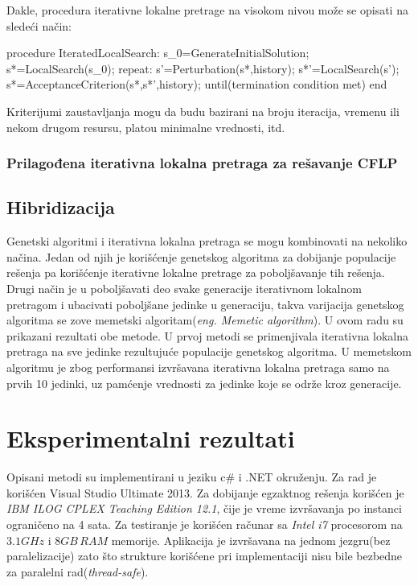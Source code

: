 \documentclass[a4paper]{article}
\begin{document}
Dakle, procedura iterativne lokalne pretrage na visokom nivou može se opisati na sledeći način:

\begin{algorithm}
procedure IteratedLocalSearch:
	s_0=GenerateInitialSolution;
	s*=LocalSearch(s_0);
	repeat:
		s'=Perturbation(s*,history);
		s*'=LocalSearch(s');
		s*=AcceptanceCriterion(s*,s*',history);
	until(termination condition met)
end
\end{algorithm}

Kriterijumi zaustavljanja mogu da budu bazirani na broju iteracija, vremenu ili nekom drugom resursu, platou minimalne vrednosti, itd.

\subsubsection{Prilagođena iterativna lokalna pretraga za rešavanje CFLP}
\subsection{Hibridizacija}

Genetski algoritmi i iterativna lokalna pretraga se mogu kombinovati na nekoliko načina. Jedan od njih je korišćenje genetskog algoritma za dobijanje populacije rešenja pa korišćenje iterativne lokalne pretrage za poboljšavanje tih rešenja. Drugi način je u poboljšavati deo svake generacije iterativnom lokalnom pretragom i ubacivati poboljšane jedinke u generaciju, takva varijacija genetskog algoritma se zove memetski algoritam(\emph{eng. Memetic algorithm})\cite{memetic}. U ovom radu su prikazani rezultati obe metode. U prvoj metodi se primenjivala iterativna lokalna pretraga na sve jedinke rezultujuće populacije genetskog algoritma. U memetskom algoritmu je zbog performansi izvršavana iterativna lokalna pretraga samo na prvih 10 jedinki, uz pamćenje vrednosti za jedinke koje se održe kroz generacije.
\section{Eksperimentalni rezultati}

Opisani metodi su implementirani u jeziku c\# i .NET okruženju. Za rad je korišćen Visual Studio Ultimate 2013. Za dobijanje egzaktnog rešenja korišćen je \emph{IBM ILOG CPLEX Teaching Edition 12.1}, čije je vreme izvršavanja po instanci ograničeno na 4 sata. Za testiranje je korišćen računar sa \emph{Intel i7} procesorom na $3.1GHz$ i $8GB \, RAM$ memorije. Aplikacija je izvršavana na jednom jezgru(bez paralelizacije) zato što strukture korišćene pri implementaciji nisu bile bezbedne za paralelni rad(\emph{thread-safe}).
\end{document}
